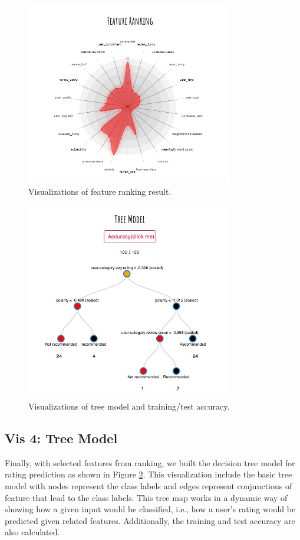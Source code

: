\documentclass{vgtc}                          %
\begin{document}
\begin{figure}[h]
  \centering
  \includegraphics[width=9cm]{vis_3.png}
  \caption{Visualizations of feature ranking result.}
  \label{fig:vis_3}
\end{figure}

\begin{figure}[h]
  \centering
  \includegraphics[width=9cm]{vis_4.jpg}
  \caption{Visualizations of tree model and training/test accuracy.}
  \label{fig:vis_4}
\end{figure}

\subsection{Vis 4: Tree Model}

Finally, with selected features from ranking, we built the decision tree model for rating prediction as shown in Figure \ref{fig:vis_4}. This visualization include the basic tree model with nodes represent the class labels and edges represent conjunctions of feature that lead to the class labels. This tree map works in a dynamic way of showing how a given input would be classified, i.e., how a user's rating would be predicted given related features. Additionally, the training and test accuracy are also calculated. 
\end{document}

